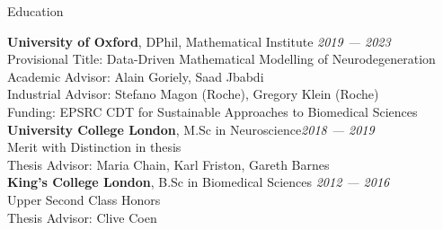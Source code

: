 \begin{rSection}{Education}

{\bf University of Oxford}, DPhil, Mathematical Institute  \hfill {\em 2019 — 2023} \\
Provisional Title: Data-Driven Mathematical Modelling of Neurodegeneration \\
Academic Advisor: Alain Goriely, Saad Jbabdi \\
Industrial Advisor: Stefano Magon (Roche), Gregory Klein (Roche)\\
Funding: EPSRC CDT for Sustainable Approaches to Biomedical Sciences \\

{\bf University College London},  M.Sc in Neuroscience\hfill {\em 2018 — 2019} \\ 
Merit with Distinction in thesis \\
Thesis Advisor: Maria Chain, Karl Friston, Gareth Barnes \\

{\bf King's College London}, B.Sc in Biomedical Sciences \hfill {\em 2012 — 2016} \\ 
Upper Second Class Honors \\
Thesis Advisor: Clive Coen

\end{rSection}

